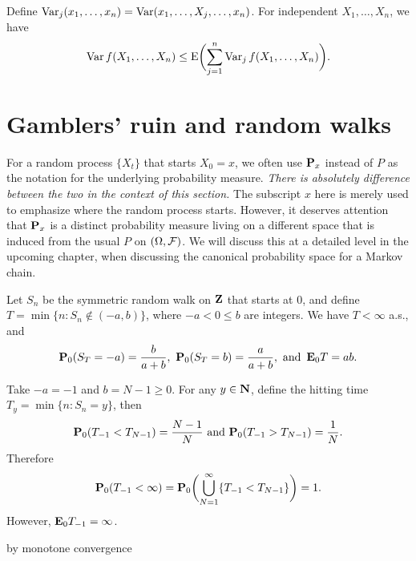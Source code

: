 \begin{namedthm}
    Define $\operatorname{Var}_j(x_1,\dotsc,x_n) = \operatorname{Var}(x_1,\dotsc,X_j,\dotsc,x_n)$. For independent $X_1,\dotsc,X_n$, we have \[
        \operatorname{Var} f(X_1,\dotsc,X_n) \leq \mathop{}\!\mathrm{E} \biggl(\sum_{j=1}^n \operatorname{Var}_j f(X_1,\dotsc,X_n)\biggr).
    \]
\end{namedthm}

\section{Gamblers' ruin and random walks}

For a random process $\{X_t\}$ that starts $X_0 = x$, we often use $\mathbf{P}_x$ instead of $P$ as the notation for the underlying probability measure. \emph{There is absolutely difference between the two in the context of this section.} The subscript $x$ here is merely used to emphasize where the random process starts. However, it deserves attention that $\mathbf{P}_x$ is a distinct probability measure living on a different space that is induced from the usual $P$ on $(\Omega, \mathcal{F})$. We will discuss this at a detailed level in the upcoming chapter, when discussing the canonical probability space for a Markov chain.

\begin{thm}
    Let $S_n$ be the symmetric random walk on $\mathbf{Z}$ that starts at $0$, and define $T = \min\{n  : S_n \notin (-a,b)\}$, where $-a < 0 \leq b$ are integers. We have $T< \infty$ a.s., and \[
        \mathbf{P}_0(S_T = - a) = \frac{b}{a+b},\ \mathbf{P}_0(S_T = b) = \frac{a}{a+b}, \text{ and } \mathop{}\!\mathbf{E}_0 T = ab.
    \]
\end{thm}

Take $-a = -1$ and $b = N-1 \geq 0$. For any $y\in \mathbf{N}$, define the hitting time $T_y = \min\{n : S_n = y\}$, then \[
    \mathbf{P}_0(T_{-1} < T_{N-1}) = \frac{N - 1}{N} \text{ and }\mathbf{P}_0(T_{-1} > T_{N-1}) = \frac{1}{N}.
\] Therefore \[
    \mathbf{P}_0(T_{-1} < \infty) = \mathbf{P}_0\biggl(\bigcup_{N=1}^\infty \{T_{-1} < T_{N-1}\}\biggr) = 1.
\] However, $\mathop{}\!\mathbf{E}_0 T_{-1} = \infty$.

by monotone convergence

